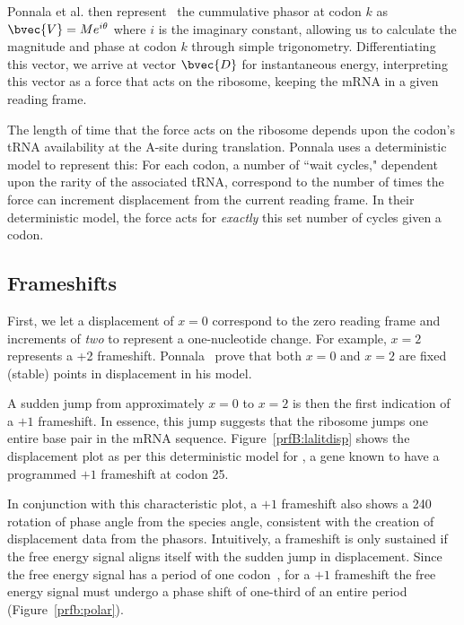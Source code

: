 \documentclass[12pt, draft]{article}
\numberwithin{equation}{section}
\begin{document}
Ponnala et al. then represent~\cite{lalit:embs} the cummulative phasor at codon $k$ as $\bvec{V} = Me^{i\theta}$
where $i$ is the imaginary constant, allowing us to calculate the magnitude and phase at codon $k$ through
simple trigonometry. Differentiating this vector, we arrive at vector $\bvec{D}$ for instantaneous energy, interpreting this
vector as a force that acts on the ribosome, keeping the mRNA in a given reading frame.

The length of time that the force acts on the ribosome depends upon the codon's tRNA availability at the A-site during translation.
Ponnala uses a deterministic model to represent this: For each codon, a number
of ``wait cycles," dependent upon the rarity of the associated tRNA, correspond to the number
of times the force can increment displacement from the current reading frame.
In their deterministic model, the force acts for \emph{exactly} this set number of cycles given a codon.

\subsection{Frameshifts}


First, we let a displacement of $x = 0$ correspond to the zero reading frame and increments of
\emph{two} to represent a one-nucleotide change. For example, $x =2$ represents a +2 frameshift.
Ponnala~\cite{lalit:embs} prove that both $x = 0$ and $x = 2$ are fixed (stable) points in displacement in his model.


A sudden jump from approximately $x = 0$ to $x = 2$ is then the first indication of a $+1$ frameshift.
In essence, this jump suggests that the ribosome jumps one entire base pair in the mRNA sequence.
Figure~\ref{prfB:lalitdisp} shows the displacement plot as per this deterministic model for \prfB, 
a gene known to have a programmed $+1$ frameshift at codon 25.

In conjunction with this characteristic plot, a $+1$ frameshift also shows a 240\degree
rotation of phase angle from the species angle, consistent with the creation of displacement data from the phasors.
Intuitively, a frameshift is only sustained if the free energy signal aligns itself with the sudden jump in displacement.
Since the free energy signal has a period of one codon~\cite{lalit:mechanics}, for a $+1$ frameshift the free energy signal
must undergo a phase shift of one-third of an entire period (Figure~\ref{prfb:polar}).
\end{document}
